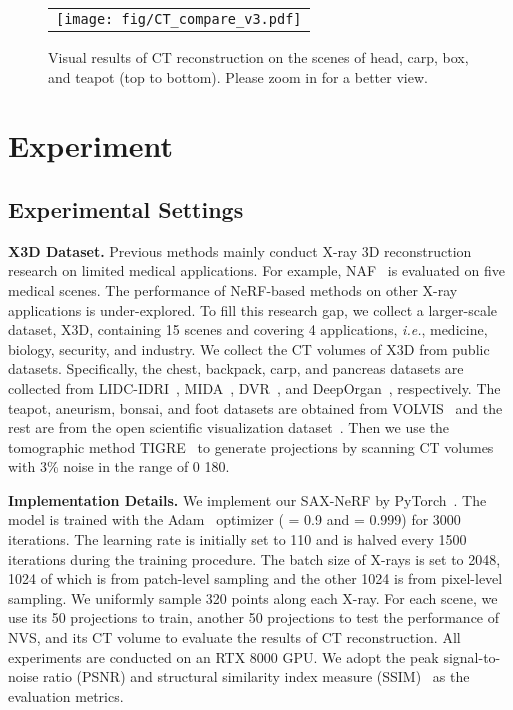 \documentclass[10pt,twocolumn,letterpaper]{article}
\begin{document}
\begin{figure*}[t]
	\begin{center}
		\begin{tabular}[t]{c} \hspace{-2.8mm}
			\texttt{[image: fig/CT\_compare\_v3.pdf]}
		\end{tabular}
	\end{center}
	\vspace{-5mm}
	\caption{\small Visual results of CT reconstruction on the scenes of head, carp, box, and teapot (top to bottom). Please zoom in for a better view.}
	\label{fig:ct_vis_compare}
	\vspace{-1mm}
\end{figure*}

\section{Experiment}
\label{sec:exp}


\subsection{Experimental Settings}
\vspace{0mm}

\noindent\textbf{X3D Dataset.} Previous methods mainly conduct X-ray 3D reconstruction research on limited medical applications. For example, NAF~\cite{naf} is evaluated on five medical scenes. The performance of NeRF-based methods on other X-ray applications is under-explored. To fill this research gap, we collect a larger-scale dataset, X3D, containing 15 scenes and covering 4 applications, \emph{i.e.}, medicine, biology, security, and industry. We collect the CT volumes of X3D from public datasets. Specifically, the chest, backpack, carp, and pancreas datasets are collected from LIDC-IDRI~\cite{LIDC-IDRI}, MIDA~\cite{backpack}, DVR~\cite{carp}, and DeepOrgan~\cite{pancreas}, respectively. The teapot, aneurism, bonsai, and foot datasets are obtained from VOLVIS~\cite{volvis} and the rest are from the open scientific visualization dataset~\cite{osvd}. Then we use the tomographic method TIGRE~\cite{tigre} to generate projections by scanning CT volumes with 3\% noise in the range of 0  180.

\vspace{1mm}
\noindent\textbf{Implementation Details.} We implement our SAX-NeRF by PyTorch~\cite{pytorch}. The model is trained with the Adam~\cite{adam} optimizer ( = 0.9 and  = 0.999) for 3000 iterations. The learning rate is initially set to 110 and is halved every 1500 iterations during the training procedure. The batch size of X-rays is set to 2048, 1024 of which is from patch-level sampling and the other 1024 is from pixel-level sampling. We uniformly sample 320 points along each X-ray. For each scene, we use its 50 projections to train, another 50 projections to test the performance of NVS, and its CT volume to evaluate the results of CT reconstruction. All experiments are conducted on an RTX 8000 GPU. We adopt the peak signal-to-noise ratio (PSNR) and structural similarity index measure (SSIM)~\cite{ssim} as the evaluation metrics.
\end{document}
